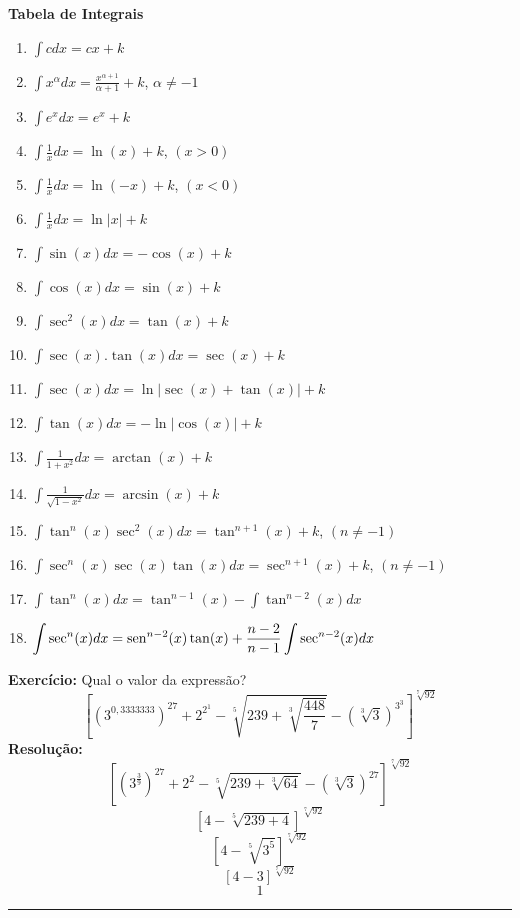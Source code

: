 \documentclass[oneside,a4paper,12pt]{article}
\newcommand{\sen}{{\rm sen}}
\begin{document}
\vspace{300pt}


\newpage
\begin{center}
{\Large{\bf Tabela de Integrais}}	
\end{center}

	\begin{enumerate}
		\item $\displaystyle \int cdx = cx + k$
		\item $\displaystyle \int x^{\alpha}dx = \frac{x^{\alpha + 1}}{\alpha + 1} + k$, $\alpha \neq -1$
		\item $\displaystyle \int e^x dx = e^x + k$
		\item $\displaystyle \int \frac{1}{x}dx = \ln(x) + k$, $(x > 0)$
		\item $\displaystyle \int \frac{1}{x}dx = \ln(-x) + k$, $(x < 0)$
		\item $\displaystyle \int \frac{1}{x}dx = \ln|x| + k$
		\item $\displaystyle \int \sin(x) dx = - \cos(x) + k$
		\item $\displaystyle \int \cos(x) dx = \sin(x) + k$
		\item $\displaystyle \int \sec^{2}(x)dx = \tan(x) + k$
		\item $\displaystyle \int \sec(x).\tan(x)dx = \sec(x) + k$
		\item $\displaystyle \int \sec(x)dx = \ln|\sec(x)+\tan(x)| + k$
		\item $\displaystyle \int \tan(x)dx = -\ln|\cos(x)|+ k$
		\item $\displaystyle \int \frac{1}{1+x^2}dx = \arctan(x) + k$
		\item $\displaystyle \int \frac{1}{\sqrt{1 - x^2}}dx = \arcsin(x) + k$
		\item $\displaystyle \int \tan^{n}(x)\sec^{2}(x)dx = \tan^{n+1}(x) + k$, $(n \neq -1)$
		\item $\displaystyle \int \sec^{n}(x)\sec(x)\tan(x)dx = \sec^{n+1}(x) + k$, $(n \neq -1)$
		\item $\displaystyle \int \tan^{n}(x)dx = \tan^{n-1}(x) - \displaystyle \int \tan^{n-2}(x)dx$
		\item $\displaystyle \int \sec^{n}(x)dx = \sen^{n-2}(x)\tan(x) + \frac{n-2}{n-1}\displaystyle \int \sec^{n-2}(x)dx$
	\end{enumerate}


\newpage

{\bf Exercício:} Qual o valor da expressão?
$$\left[(3^{0,3333333})^{27}+ 2^{2^1} - \sqrt[5]{239 + \sqrt[3]{\frac{448}{7}}}-(\sqrt[3]{3})^{3^3} \right]^{\sqrt[7]{92}}$$
{\bf Resolução:}\\
$$\left[(3^{\frac{3}{9}})^{27}+ 2^2 - \sqrt[5]{239 + \sqrt[3]{64}}-(\sqrt[3]{3})^{27} \right]^{\sqrt[7]{92}}$$
$$\left[4 - \sqrt[5]{239 + 4}\right]^{\sqrt[7]{92}}$$
$$\left[4 - \sqrt[5]{3^5}\right]^{\sqrt[7]{92}}$$
$$\left[4 - 3\right]^{\sqrt[7]{92}}$$
$$1$$

\rule{17cm}{0.7mm}
\end{document}
